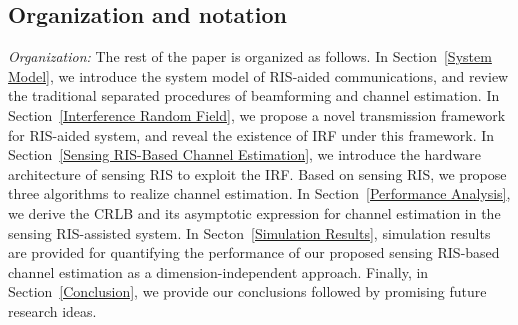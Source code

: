 \documentclass[12pt,draftclsnofoot,journal,onecolumn]{IEEEtran}
\theoremstyle{nonumberplain}
\begin{document}
\begin{itemize}
    \end{itemize}

\subsection{Organization and notation}

\textit{Organization:}
The rest of the paper is organized as follows.
In Section~\ref{System Model}, we introduce the system model of RIS-aided communications, and review the traditional separated procedures of beamforming and channel estimation.
In Section~\ref{Interference Random Field}, we propose a novel transmission framework for RIS-aided system, and reveal the existence of \ac{IRF} under this framework.
In Section~\ref{Sensing RIS-Based Channel Estimation}, we introduce the hardware architecture of sensing RIS to exploit the \ac{IRF}.
Based on sensing RIS, we propose three algorithms to realize channel estimation.
In Section~\ref{Performance Analysis}, we derive the \ac{CRLB} and its asymptotic expression for channel estimation in the sensing RIS-assisted system.
In Secton~\ref{Simulation Results}, simulation results are provided for quantifying the performance of our proposed sensing RIS-based channel estimation as a dimension-independent approach.
Finally, in Section~\ref{Conclusion}, we provide our conclusions followed by promising future research ideas.
\end{document}
